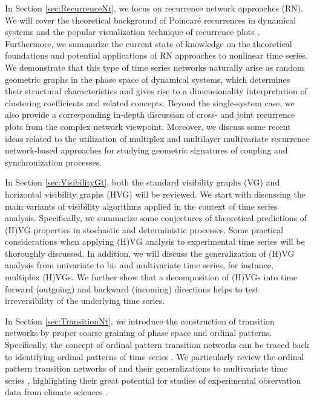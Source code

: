 In Section \ref{sec:RecurrenceNt}, we focus on recurrence network approaches (RN). We will cover the theoretical background of Poincar\'e recurrences in dynamical systems and the popular visualization technique of recurrence plots \cite{marwan2007}. Furthermore, we summarize the current state of knowledge on the theoretical foundations and potential applications of RN approaches to nonlinear time series. We demonstrate that this type of time series networks naturally arise as random geometric graphs in the phase space of dynamical systems, which determines their structural characteristics and gives rise to a dimensionality interpretation of clustering coefficients and related concepts. Beyond the single-system case, we also provide a corresponding in-depth discussion of cross- and joint recurrence plots from the complex network viewpoint. Moreover, we discuss some recent ideas related to the utilization of multiplex and multilayer multivariate recurrence network-based approaches for studying geometric signatures of coupling and synchronization processes. 

In Section \ref{sec:VisibilityGt}, both the standard visibility graphs (VG) and horizontal visibility graphs (HVG) will be reviewed. We start with discussing the main variants of visibility algorithms applied in the context of time series analysis. Specifically, we summarize some conjectures of theoretical predictions of (H)VG properties in stochastic and deterministic processes. Some practical considerations when applying (H)VG analysis to experimental time series will be thoroughly discussed. In addition, we will discuss the generalization of (H)VG analysis from univariate to bi- and multivariate time series, for instance, multiplex (H)VGs. We further show that a decomposition of (H)VGs into time forward (outgoing) and backward (incoming) directions helps to test irreversibility of the underlying time series. 

In Section \ref{sec:TransitionNt}, we introduce the construction of transition networks by proper coarse graining of phase space and ordinal patterns. Specifically, the concept of ordinal pattern transition networks can be traced back to identifying ordinal patterns of time series \cite{Bandt2002}. We particularly review the ordinal pattern transition networks of \cite{McCullough2015} and their generalizations to multivariate time series \cite{Zhang2017b}, highlighting their great potential for studies of experimental observation data from climate sciences \cite{Eroglu2016}. 

